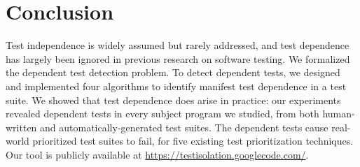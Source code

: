 
\section{Conclusion}
\label{sec:questions}


Test independence is widely assumed but rarely addressed, and
test dependence has largely been ignored in previous
research on software testing. 
We formalized the dependent test detection
problem. To detect dependent tests, we designed
and implemented four algorithms to identify manifest test dependence
in a test suite.
We showed that 
test dependence {does} arise in practice:  our experiments revealed
dependent tests in every subject program
we studied, from both human-written and automatically-generated test
suites.
The dependent tests cause real-world prioritized test suites to fail, for
five existing test prioritization techniques.
Our tool is publicly available at
\url{https://testisolation.googlecode.com/}.


